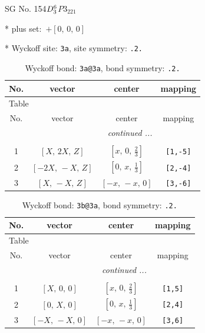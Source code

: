 \documentclass[fleqn,8pt]{jsarticle}
\begin{document}
\setcounter{MaxMatrixCols}{32}

\renewcommand{\tablename}{Table~}
\renewcommand{\figurename}{Figure~}
\begin{center}
\LARGE
SG No. 154\quad$D_{\rm 3}^{6}$\quad$P3_221$\quad[ trigonal ]
\end{center}

* plus set:\,\,\,$+\left[ 0,\, 0,\, 0 \right]$


* Wyckoff site: {\tt 3a}, site symmetry: {\tt .2.}
\renewcommand{\arraystretch}{1.2}
\begin{longtable}{cccc}
\caption{Wyckoff bond: {\tt 3a@3a}, bond symmetry: {\tt .2.}}
 \\
 \hline \hline
No. & vector & center & mapping \\ \hline \endfirsthead

\multicolumn{3}{l}{\tablename\ \thetable{}} \\
 \hline \hline
No. & vector & center & mapping \\ \hline \endhead

 \hline \hline
\multicolumn{3}{r}{\footnotesize\it continued ...} \\ \endfoot

 \hline \hline
\multicolumn{3}{r}{} \\ \endlastfoot

1 & $\left[ X,\, 2 X,\, Z \right]$ & $\left[ x,\, 0,\, \frac{2}{3} \right]$ & {\tt [1,-5]} \\ \hline
2 & $\left[ - 2 X,\, - X,\, Z \right]$ & $\left[ 0,\, x,\, \frac{1}{3} \right]$ & {\tt [2,-4]} \\ \hline
3 & $\left[ X,\, - X,\, Z \right]$ & $\left[ - x,\, - x,\, 0 \right]$ & {\tt [3,-6]} \\
\end{longtable}
\renewcommand{\arraystretch}{1.2}
\begin{longtable}{cccc}
\caption{Wyckoff bond: {\tt 3b@3a}, bond symmetry: {\tt .2.}}
 \\
 \hline \hline
No. & vector & center & mapping \\ \hline \endfirsthead

\multicolumn{3}{l}{\tablename\ \thetable{}} \\
 \hline \hline
No. & vector & center & mapping \\ \hline \endhead

 \hline \hline
\multicolumn{3}{r}{\footnotesize\it continued ...} \\ \endfoot

 \hline \hline
\multicolumn{3}{r}{} \\ \endlastfoot

1 & $\left[ X,\, 0,\, 0 \right]$ & $\left[ x,\, 0,\, \frac{2}{3} \right]$ & {\tt [1,5]} \\ \hline
2 & $\left[ 0,\, X,\, 0 \right]$ & $\left[ 0,\, x,\, \frac{1}{3} \right]$ & {\tt [2,4]} \\ \hline
3 & $\left[ - X,\, - X,\, 0 \right]$ & $\left[ - x,\, - x,\, 0 \right]$ & {\tt [3,6]} \\
\end{longtable}
\end{document}
